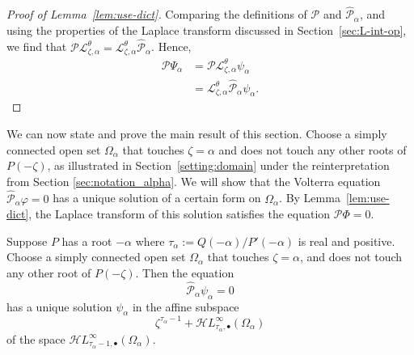 \documentclass[final]{siamart220329}
\newcommand{\laplace}{\mathcal{L}}
\newcommand{\singexp}[2]{\mathcal{H}L^\infty_{#1, #2}}
\newcommand{\singexpalg}[1]{\singexp{#1}{\bullet}}
\newcommand{\domain}{\Omega}
\begin{document}
\begin{proof}[Proof of Lemma~\ref{lem:use-dict}]
Comparing the definitions of $\mathcal{P}$ and $\hat{\mathcal{P}}_\alpha$, and using the properties of the Laplace transform discussed in Section~\ref{sec:L-int-op}, we find that $\mathcal{P} \laplace_{\zeta,\alpha}^\theta = \laplace_{\zeta,\alpha}^\theta \hat{\mathcal{P}}_\alpha$. Hence,
\begin{align*}
\mathcal{P}\Psi_\alpha & = \mathcal{P}\laplace_{\zeta,\alpha}^{\theta}\psi_\alpha \\
& = \laplace_{\zeta,\alpha}^{\theta}\hat{\mathcal{P}}_\alpha\psi_\alpha.
\end{align*}
\end{proof}

We can now state and prove the main result of this section. Choose a simply connected open set $\domain_\alpha$ that touches $\zeta = \alpha$ and does not touch any other roots of $P(-\zeta)$, as illustrated in Section~\ref{setting:domain} under the reinterpretation from Section \ref{sec:notation_alpha}. We will show that the Volterra equation $\hat{\mathcal{P}}_\alpha \varphi = 0$ has a unique solution of a certain form on $\domain_\alpha$. By Lemma~\ref{lem:use-dict}, the Laplace transform of this solution satisfies the equation $\mathcal{P}\Phi = 0$.
\begin{theorem}\label{thm:example}
Suppose $P$ has a root $-\alpha$ where $\tau_\alpha := Q(-\alpha)/P'(-\alpha)$ is real and positive. Choose a simply connected open set $\domain_\alpha$ that touches
$\zeta = \alpha$, and does not touch any other root of $P(-\zeta)$. Then the equation
\[ \hat{\mathcal{P}}_\alpha \psi_\alpha = 0 \]
has a unique solution $\psi_\alpha$ in the affine subspace
\[ \zeta^{\tau_\alpha-1} + \singexpalg{\tau_\alpha}(\domain_\alpha) \]
of the space $\singexpalg{\tau_\alpha-1}(\domain_\alpha)$.
\end{theorem}
\end{document}
